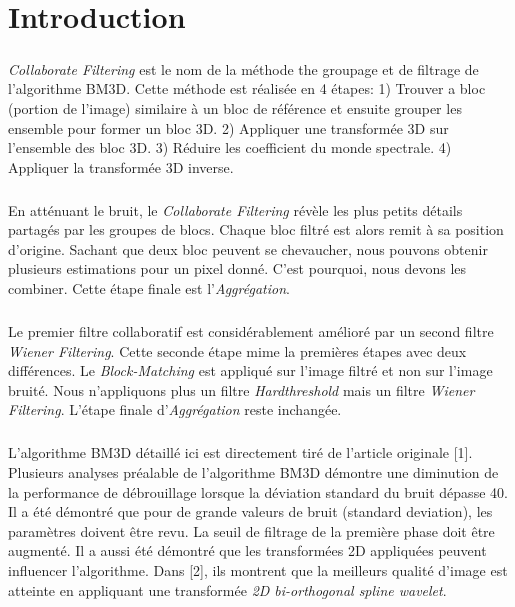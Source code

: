 
\chapter{Introduction}
\paragraph{}
\textit{Collaborate Filtering} est le nom de la méthode the groupage et de filtrage de l'algorithme BM3D. Cette méthode est réalisée en 4 étapes: 1) Trouver a bloc (portion de l'image) similaire à un bloc de référence et ensuite grouper les ensemble pour former un bloc 3D. 2) Appliquer une transformée 3D sur l'ensemble des bloc 3D. 3) Réduire les coefficient du monde spectrale. 4) Appliquer la transformée 3D inverse. 
\paragraph{}
En atténuant le bruit, le \textit{Collaborate Filtering} révèle les plus petits détails partagés par les groupes de blocs. Chaque bloc filtré est alors remit à sa position d'origine. Sachant que deux bloc peuvent se chevaucher, nous pouvons obtenir plusieurs estimations pour un pixel donné. C'est pourquoi, nous devons les combiner. Cette étape finale est l'\textit{Aggrégation}.
\paragraph{}
Le premier filtre collaboratif est considérablement amélioré par un second filtre \textit{Wiener Filtering}. Cette seconde étape mime la premières étapes avec deux différences. Le \textit{Block-Matching} est appliqué sur l'image filtré et non sur l'image bruité. Nous n'appliquons plus un filtre \textit{Hardthreshold} mais un filtre \textit{Wiener Filtering}. L'étape finale d'\textit{Aggrégation} reste inchangée.
\paragraph{}
L'algorithme BM3D détaillé ici est directement tiré de l'article originale [1]. Plusieurs analyses préalable de l'algorithme BM3D démontre une diminution de la performance de débrouillage lorsque la déviation standard du bruit dépasse 40. Il a été démontré que pour de grande valeurs de bruit (standard deviation), les paramètres doivent être revu. La seuil de filtrage de la première phase doit être augmenté. Il a aussi été démontré que les transformées 2D appliquées peuvent influencer l'algorithme. Dans [2], ils montrent que la meilleurs qualité d'image est atteinte en appliquant une transformée \textit{2D bi-orthogonal spline wavelet}. 
